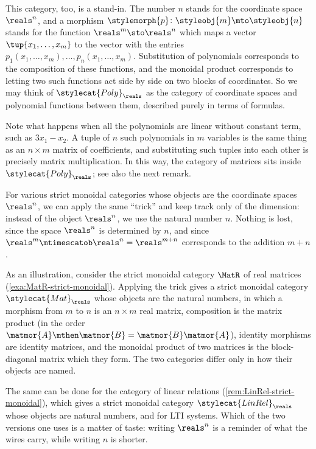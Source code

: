 \begin{example}
    This category, too, is a stand-in.
    The number $n$ stands for the coordinate space $\reals^n$, and a morphism $\stylemorph{p} \colon \styleobj{m} \mto \styleobj{n}$ stands for the function $\reals^m \sto \reals^n$ which maps a vector $\tup{x_1, \dots, x_m}$ to the vector with the entries $p_1(x_1, \dots, x_m), \dots, p_n(x_1, \dots, x_m)$.
    Substitution of polynomials corresponds to the composition of these functions, and the monoidal product corresponds to letting two such functions act side by side on two blocks of coordinates.
    So we may think of $\stylecat{Poly}_\reals$ as the category of coordinate spaces and polynomial functions between them, described purely in terms of formulas.

    Note what happens when all the polynomials are linear without constant term, such as $3 x_1 - x_2$.
    A tuple of $n$ such polynomials in $m$ variables is the same thing as an $n \times m$ matrix of coefficients, and substituting such tuples into each other is precisely matrix multiplication.
    In this way, the category of matrices sits inside $\stylecat{Poly}_\reals$; see also the next remark.
\end{example}

\begin{remark}
    \label{rem:dimension-trick}
    For various strict monoidal categories whose objects are the coordinate spaces $\reals^n$, we can apply the same ``trick'' and keep track only of the dimension: instead of the object $\reals^n$, we use the natural number $n$.
    Nothing is lost, since the space $\reals^n$ is determined by $n$, and since $\reals^{m} \mtimescatob \reals^{n} = \reals^{m+n}$ corresponds to the addition $m + n$.

    As an illustration, consider the strict monoidal category $\MatR$ of real matrices (\cref{exa:MatR-strict-monoidal}).
    Applying the trick gives a strict monoidal category $\stylecat{Mat}_\reals$ whose objects are the natural numbers, in which a morphism from $m$ to $n$ is an $n \times m$ real matrix, composition is the matrix product (in the order $\matmor{A} \mthen \matmor{B} = \matmor{B}\matmor{A}$), identity morphisms are identity matrices, and the monoidal product of two matrices is the block-diagonal matrix which they form.
    The two categories differ only in how their objects are named.

    The same can be done for the category of linear relations (\cref{rem:LinRel-strict-monoidal}), which gives a strict monoidal category $\stylecat{LinRel}_\reals$ whose objects are natural numbers, and for LTI systems.
    Which of the two versions one uses is a matter of taste: writing $\reals^n$ is a reminder of what the wires carry, while writing $n$ is shorter.
\end{remark}

